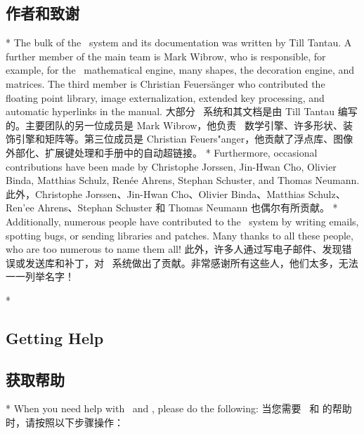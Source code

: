 \begin{paracol}{2}
\subsection{作者和致谢}
\switchcolumn[0]*
The bulk of the \pgfname\ system and its documentation was written by Till
Tantau. A further member of the main team is Mark Wibrow, who is responsible,
for example, for the \pgfname\ mathematical engine, many shapes, the decoration
engine, and matrices. The third member is Christian Feuers\"anger who
contributed the floating point library, image externalization, extended key
processing, and automatic hyperlinks in the manual.
\switchcolumn
大部分 \pgfname\ 系统和其文档是由 Till Tantau 编写的。主要团队的另一位成员是 Mark Wibrow，他负责 \pgfname\ 数学引擎、许多形状、装饰引擎和矩阵等。第三位成员是 Christian Feuers"anger，他贡献了浮点库、图像外部化、扩展键处理和手册中的自动超链接。
\switchcolumn[0]*
Furthermore, occasional contributions have been made by Christophe Jorssen,
Jin-Hwan Cho, Olivier Binda, Matthias Schulz, Ren\'ee Ahrens, Stephan Schuster,
and Thomas Neumann.
\switchcolumn
此外，Christophe Jorssen、Jin-Hwan Cho、Olivier Binda、Matthias Schulz、Ren'ee Ahrens、Stephan Schuster 和 Thomas Neumann 也偶尔有所贡献。
\switchcolumn[0]*
Additionally, numerous people have contributed to the \pgfname\ system by
writing emails, spotting bugs, or sending libraries and patches. Many thanks to
all these people, who are too numerous to name them all!
\switchcolumn
此外，许多人通过写电子邮件、发现错误或发送库和补丁，对 \pgfname\ 系统做出了贡献。非常感谢所有这些人，他们太多，无法一一列举名字！

\switchcolumn[0]*
\subsection{Getting Help}
\switchcolumn
\subsection{获取帮助}
\switchcolumn[0]*
When you need help with \pgfname\ and \tikzname, please do the following:
\switchcolumn
当您需要 \pgfname\ 和 \tikzname 的帮助时，请按照以下步骤操作：
\end{paracol}

